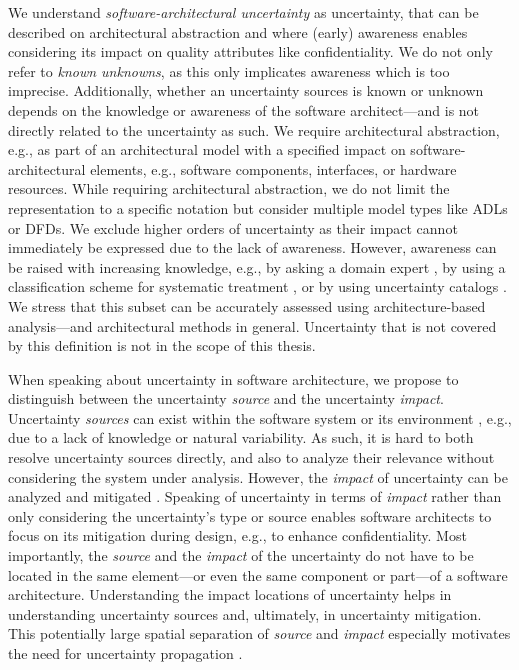 We understand \emph{software-architectural uncertainty} as uncertainty, that can be described on architectural abstraction and where (early) awareness enables considering its impact on quality attributes like confidentiality.
We do not only refer to \emph{known unknowns}, as this only implicates awareness which is too imprecise.
Additionally, whether an uncertainty sources is known or unknown depends on the knowledge or awareness of the software architect---and is not directly related to the uncertainty as such.
We require architectural abstraction, e.g., as part of an architectural model with a specified impact on software-architectural elements, e.g., software components, interfaces, or hardware resources.
While requiring architectural abstraction, we do not limit the representation to a specific notation but consider multiple model types like \acp{ADL} or \acp{DFD}.
We exclude higher orders of uncertainty \cite{perez-palacin_uncertainties_2014} as their impact cannot immediately be expressed due to the lack of awareness.
However, awareness can be raised with increasing knowledge, e.g., by asking a domain expert \cite{perez-palacin_dealing_2014}, by using a classification scheme for systematic treatment \cite{walker_defining_2003}, or by using uncertainty catalogs \cite{hahner_arcn_2024}.
We stress that this subset can be accurately assessed using architecture-based analysis---and architectural methods in general.
Uncertainty that is not covered by this definition is not in the scope of this thesis.

When speaking about uncertainty in software architecture, we propose to distinguish between the uncertainty \emph{source} and the uncertainty \emph{impact}.
Uncertainty \emph{sources} can exist within the software system or its environment \cite{acosta_uncertainty_2022}, e.g., due to a lack of knowledge or natural variability.
As such, it is hard to both resolve uncertainty sources directly, and also to analyze their relevance without considering the system under analysis.
However, the \emph{impact} of uncertainty can be analyzed and mitigated \cite{acosta_uncertainty_2022}.
Speaking of uncertainty in terms of \emph{impact} rather than only considering the uncertainty's type or source enables software architects to focus on its mitigation during design, e.g., to enhance confidentiality.
Most importantly, the \emph{source} and the \emph{impact} of the uncertainty do not have to be located in the same element---or even the same component or part---of a software architecture.
Understanding the impact locations of uncertainty helps in understanding uncertainty sources and, ultimately, in uncertainty mitigation.
This potentially large spatial separation of \emph{source} and \emph{impact} especially motivates the need for uncertainty propagation \cite{hahner_architecture-based_2023,camara_uncertainty_2024}.

